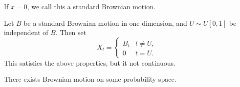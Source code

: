 \documentclass[12pt]{article}
\begin{document}
\begin{remark}
	If $x = 0$, we call this a standard Brownian motion.
\end{remark}

\begin{exbox}
	Let $B$ be a standard Brownian motion in one dimension, and $U \sim U[0, 1]$ be independent of $B$. Then set
	\[
	X_t =
	\begin{cases}
		B_t & t \neq U, \\
		0 & t = U.
	\end{cases}
	\]
	This satisfies the above properties, but it not continuous.
\end{exbox}

\begin{theorem}[Wiener]
	There exists Brownian motion on some probability space.
\end{theorem}
\end{document}
